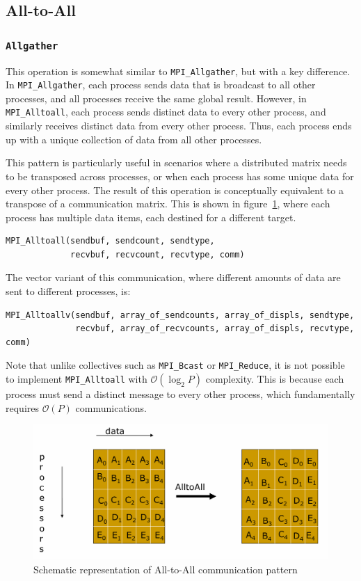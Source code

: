 \documentclass[12pt]{book}
\begin{document}
\subsection{All-to-All}
\subsubsection*{\texttt{Allgather}}
This operation is somewhat similar to \texttt{MPI\_Allgather}, but with a key difference. In \texttt{MPI\_Allgather}, each process sends data that is broadcast to all other processes, and all processes receive the same global result. However, in \texttt{MPI\_Alltoall}, each process sends distinct data to every other process, and similarly receives distinct data from every other process. Thus, each process ends up with a unique collection of data from all other processes.

This pattern is particularly useful in scenarios where a distributed matrix needs to be transposed across processes, or when each process has some unique data for every other process. The result of this operation is conceptually equivalent to a transpose of a communication matrix. This is shown in figure~\ref{fig:alltoall}, where each process has multiple data items, each destined for a different target.

\begin{lstlisting}[style=cppstyle]
MPI_Alltoall(sendbuf, sendcount, sendtype,
             recvbuf, recvcount, recvtype, comm)
\end{lstlisting}

The vector variant of this communication, where different amounts of data are sent to different processes, is:

\begin{lstlisting}[style=cppstyle]
MPI_Alltoallv(sendbuf, array_of_sendcounts, array_of_displs, sendtype,
              recvbuf, array_of_recvcounts, array_of_displs, recvtype, comm)
\end{lstlisting}

Note that unlike collectives such as \texttt{MPI\_Bcast} or \texttt{MPI\_Reduce}, it is not possible to implement \texttt{MPI\_Alltoall} with $\mathcal{O}(\log_2 P)$ complexity. This is because each process must send a distinct message to every other process, which fundamentally requires $\mathcal{O}(P)$ communications.

\vspace{1em}
\begin{figure}[H]
    \centering
    \includegraphics[width=0.65\linewidth]{images/alltoall.png}
    \caption{Schematic representation of All-to-All communication pattern}
    \label{fig:alltoall}
\end{figure}
\end{document}
